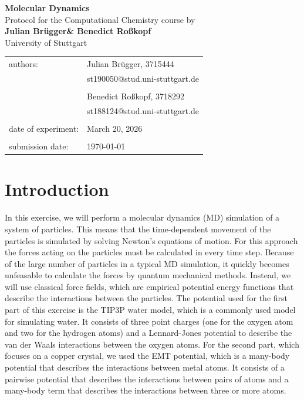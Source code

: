 \documentclass[a4paper,12pt]{scrartcl}
\makeatletter
\newcommand{\VERSUCHSDATUM}{March 20, 2026}
\newcommand{\PROTOKOLLDATUM}{\today}
\newcommand{\VerfasserEINS}{Julian Brügger}
\newcommand{\MatNoEINS}{3715444}
\newcommand{\EmailEINS}{st190050@stud.uni-stuttgart.de}
\newcommand{\VerfasserZWEI}{Benedict Roßkopf}
\newcommand{\MatNoZWEI}{3718292}
\newcommand{\EmailZWEI}{st188124@stud.uni-stuttgart.de}
\newcommand{\VERSUCHSNAME}{Molecular Dynamics}
\makeatother
\begin{document}
\begin{titlepage}
\begin{center}
\Huge{\textbf{\VERSUCHSNAME}}\\
\vspace{10mm}
\Large{Protocol for the Computational Chemistry course by \\ \textbf{\VerfasserEINS\;\& \VerfasserZWEI }}\\
\vspace{10mm} 
\Large{University of Stuttgart}\\
\end{center}
\begin{center}
\begin{tabular}{ll}
\large{authors:}        & \large{\VerfasserEINS, \MatNoEINS} \\
& \large{\EmailEINS} \\
\vspace{2mm}\\
& \large{\VerfasserZWEI, \MatNoZWEI} \\
& \large{\EmailZWEI} \\                     
\vspace{0cm}\\
\large{date of experiment:} & \large{\VERSUCHSDATUM} \\
\vspace{0cm}\\
\large{submission date:} & \large{\PROTOKOLLDATUM}
\end{tabular}
\end{center}
\end{titlepage}

\section{Introduction}
In this exercise, we will perform a molecular dynamics (MD) simulation of a system of particles. This means that the time-dependent movement of the particles is simulated by solving Newton's equations of motion.
For this approach the forces acting on the particles must be calculated in every time step. Because of the large number of particles in a typical MD simulation, it quickly becomes unfeasable to calculate the forces by quantum mechanical methods. Instead, we will use classical force fields, which are empirical potential energy functions that describe the interactions between the particles.
The potential used for the first part of this exercise is the TIP3P water model, which is a commonly used model for simulating water. It consists of three point charges (one for the oxygen atom and two for the hydrogen atoms) and a Lennard-Jones potential to describe the van der Waals interactions between the oxygen atoms.
For the second part, which focuses on a copper crystal, we used the EMT potential, which is a many-body potential that describes the interactions between metal atoms. It consists of a pairwise potential that describes the interactions between pairs of atoms and a many-body term that describes the interactions between three or more atoms.
\end{document}
